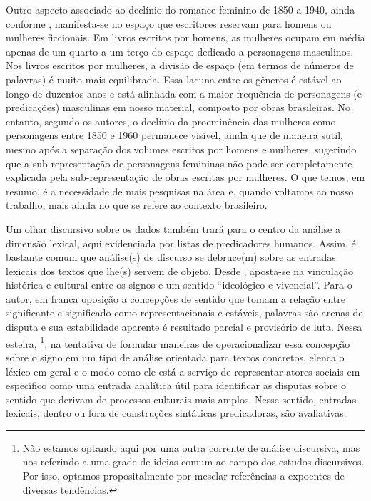 \documentclass[portuguese]{textolivre}
\begin{document}
Outro aspecto associado ao declínio do romance feminino de 1850 a 1940, ainda conforme \textcite{underwood2018}, manifesta-se no espaço que escritores reservam para homens ou mulheres ficcionais. Em livros escritos por homens, as mulheres ocupam em média apenas de um quarto a um terço do espaço dedicado a personagens masculinos. Nos livros escritos por mulheres, a divisão de espaço (em termos de números de palavras) é muito mais equilibrada. Essa lacuna entre os gêneros é estável ao longo de duzentos anos e está alinhada com a maior frequência de personagens (e predicações) masculinas em nosso material, composto por obras brasileiras. No entanto, segundo os autores, o declínio da proeminência das mulheres como personagens entre 1850 e 1960 permanece visível, ainda que de maneira sutil, mesmo após a separação dos volumes escritos por homens e mulheres, sugerindo que a sub-representação de personagens femininas não pode ser completamente explicada pela sub-representação de obras escritas por mulheres. O que temos, em resumo, é a necessidade de mais pesquisas na área e, quando voltamos ao nosso trabalho, mais ainda no que se refere ao contexto brasileiro.

Um olhar discursivo sobre os dados também trará para o centro da análise a dimensão lexical, aqui evidenciada por listas de predicadores humanos. Assim, é bastante comum que análise(s) de discurso se debruce(m) sobre as entradas lexicais dos textos que lhe(s) servem de objeto. Desde \textcite{bakhtin1979}, aposta-se na vinculação histórica e cultural entre os signos e um sentido “ideológico e vivencial”. Para o autor, em franca oposição a concepções de sentido que tomam a relação entre significante e significado como representacionais e estáveis, palavras são arenas de disputa e sua estabilidade aparente é resultado parcial e provisório de luta. Nessa esteira, \textcite{fairclough1992}\footnote{Não estamos optando aqui por uma outra corrente de análise discursiva, mas nos referindo a uma grade de ideias comum ao campo dos estudos discursivos. Por isso, optamos propositalmente por mesclar referências a expoentes de diversas tendências.}, na tentativa de formular maneiras de operacionalizar essa concepção sobre o signo em um tipo de análise orientada para textos concretos, elenca o léxico em geral e o modo como ele está a serviço de representar atores sociais em específico como uma entrada analítica útil para identificar as disputas sobre o sentido que derivam de processos culturais mais amplos. Nesse sentido, entradas lexicais, dentro ou fora de construções sintáticas predicadoras, são avaliativas.
\end{document}
